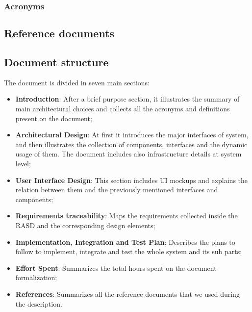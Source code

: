 \subsubsection{Acronyms}
\begin{multicols}{2}[]
    \begin{acronym}[DDacronyms]
    \end{acronym}
\end{multicols}
\subsection{Reference documents}
\subsection{Document structure}
The document is divided in seven main sections:
\begin{itemize}
    \item \textbf{Introduction}: After a brief purpose section, it illustrates the summary of main architectural choices and collects all the acronyms and definitions present on the document;
    \item \textbf{Architectural Design}: At first it introduces the major interfaces of system, and then illustrates the collection of components, interfaces and the dynamic usage of them. The document includes also infrastructure details at system level;
    \item \textbf{User Interface Design}: This section includes UI mockups and explains the relation between them and the previously mentioned interfaces and components;
    \item \textbf{Requirements traceability}: Maps the requirements collected inside the \ac{RASD} and the corresponding design elements;
    \item \textbf{Implementation, Integration and Test Plan}: Describes the plans to follow to implement, integrate and test the whole system and its sub parts;
    \item \textbf{Effort Spent}: Summarizes the total hours spent on the document formalization;
    \item \textbf{References}: Summarizes all the reference documents that we used during the description.
\end{itemize}

\clearpage